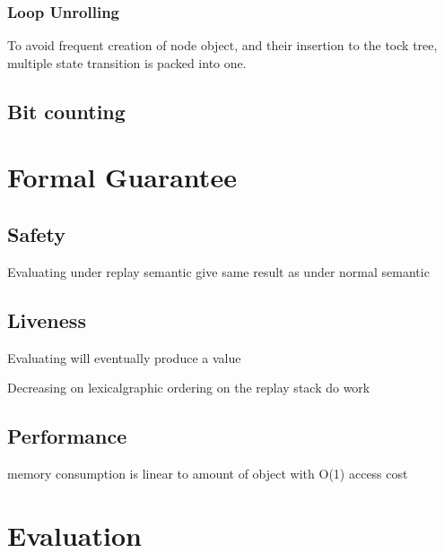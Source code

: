 \documentclass[acmsmall]{acmart}
\begin{document}
	\subsubsection{Loop Unrolling}
	To avoid frequent creation of node object, and their insertion to the tock tree, multiple state transition is packed into one.
	\subsection{Bit counting}
	\section{Formal Guarantee}
	\subsection{Safety}
	Evaluating under replay semantic give same result as under normal semantic
	\subsection{Liveness}
	Evaluating will eventually produce a value
	
	Decreasing on lexicalgraphic ordering on the replay stack do work
	\subsection{Performance}
	memory consumption is linear to amount of object with O(1) access cost
	\section{Evaluation}
\appendix
\end{document}
